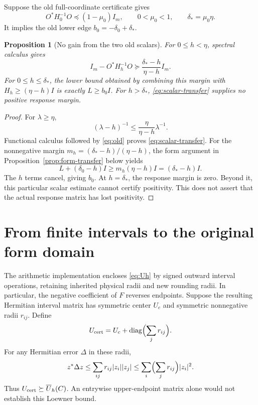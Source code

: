 \documentclass[11pt,a4paper]{article}
\newcommand{\Id}{I}
\newcommand{\diag}{\operatorname{diag}}
\newtheorem{proposition}[theorem]{Proposition}
\theoremstyle{definition}
\theoremstyle{remark}
\numberwithin{equation}{section}
\begin{document}
Suppose the old full-coordinate certificate gives
\begin{equation}\label{eq:old}
 O^*H_0^{-1}O\preceq(1-\mu_0)I_m,\qquad
 0<\mu_0<1,\qquad \delta_*=\mu_0\eta.
\end{equation}
It implies the old lower edge \(b_0=-\delta_0+\delta_*\).

\begin{proposition}[No gain from the two old scalars]\label{prop:nogain}
For \(0\le h<\eta\), spectral calculus gives
\begin{equation}\label{eq:scalar-transfer}
 I_m-O^*H_h^{-1}O\succeq
          \frac{\delta_*-h}{\eta-h}I_m.
\end{equation}
For \(0\le h\le\delta_*\), the lower bound obtained by combining this
margin with \(H_h\ge(\eta-h)\Id\) is exactly \(L\ge b_0\Id\).
For \(h>\delta_*\), \eqref{eq:scalar-transfer} supplies no positive
response margin.
\end{proposition}
\begin{proof}
For \(\lambda\ge\eta\),
\[
 (\lambda-h)^{-1}\le
       \frac{\eta}{\eta-h}\lambda^{-1}.
\]
Functional calculus followed by \eqref{eq:old} proves
\eqref{eq:scalar-transfer}. For the nonnegative margin
\(m_h=(\delta_*-h)/(\eta-h)\), the form argument in
Proposition~\ref{prop:form-transfer} below yields
\[
 L+(\delta_0-h)\Id\ge m_h(\eta-h)\Id
       =(\delta_*-h)\Id.
\]
The \(h\) terms cancel, giving \(b_0\). At \(h=\delta_*\), the
response margin is zero. Beyond it, this particular scalar estimate
cannot certify positivity. This does not assert that the actual response
matrix has lost positivity.
\end{proof}

\section{From finite intervals to the original form domain}\label{sec:finite}

The arithmetic implementation encloses \eqref{eq:Uh} by signed outward
interval operations, retaining inherited physical radii and new rounding
radii. In particular, the negative coefficient of \(F\) reverses endpoints.
Suppose the resulting Hermitian interval matrix has symmetric center \(U_c\)
and symmetric nonnegative radii \(r_{ij}\). Define
\begin{equation}\label{eq:row}
 U_{\rm cert}=U_c+\diag\Bigl(\sum_jr_{ij}\Bigr).
\end{equation}
For any Hermitian error \(\Delta\) in these radii,
\[
 z^*\Delta z\le\sum_{ij}r_{ij}|z_i||z_j|
 \le\sum_i\Bigl(\sum_jr_{ij}\Bigr)|z_i|^2.
\]
Thus \(U_{\rm cert}\succeq\overline U_h(C)\).
An entrywise upper-endpoint matrix alone would not establish this
Loewner bound.
\end{document}
